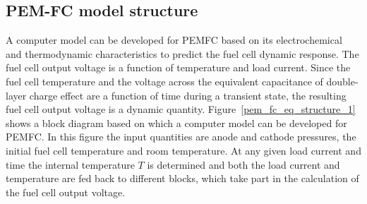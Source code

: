 \documentclass[11pt,a4paper]{article}
\numberwithin{equation}{section}
\theoremstyle{it}
\theoremstyle{definition}
\begin{document}
\subsection{PEM-FC model structure}
A computer model can be developed for PEMFC based on its electrochemical and thermodynamic characteristics to predict the fuel cell dynamic response. The fuel cell output voltage is a function of temperature and load current. Since the fuel cell temperature and the voltage across the equivalent capacitance of double-layer charge effect are a function of time during a transient state, the resulting fuel cell output voltage is a dynamic quantity. Figure~\ref{pem_fc_eq_structure_1} shows a block diagram based on which a computer model can be developed for PEMFC. In this figure the input quantities are anode and cathode pressures, the initial fuel cell temperature and room temperature. At any given load current and time the internal temperature $T$ is determined and both the load current and temperature are fed back to different blocks, which take part in the calculation of the fuel cell output voltage.
\end{document}

